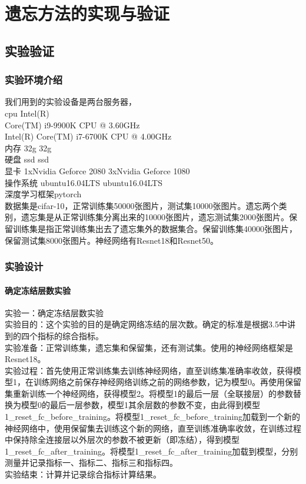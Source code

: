 
\chapter{遗忘方法的实现与验证}

\section{实验验证}

\subsection{实验环境介绍}
我们用到的实验设备是两台服务器，
\\cpu Intel(R) 
\\Core(TM) i9-9900K CPU @ 3.60GHz
\\Intel(R) Core(TM) i7-6700K CPU @ 4.00GHz
\\内存 32g 32g
\\硬盘 ssd ssd
\\显卡  1xNvidia Geforce 2080 3xNvidia Geforce 1080
\\操作系统 ubuntu16.04LTS ubuntu16.04LTS
\\深度学习框架pytorch
\\数据集是cifar-10，正常训练集50000张图片，测试集10000张图片。遗忘两个类别，遗忘集是从正常训练集分离出来的10000张图片，遗忘测试集2000张图片。保留训练集是指正常训练集出去了遗忘集外的数据集合。保留训练集40000张图片，保留测试集8000张图片。神经网络有Resnet18和Resnet50。
\subsection{实验设计}

\subsubsection{确定冻结层数实验}
实验一：确定冻结层数实验
\\实验目的：这个实验的目的是确定网络冻结的层次数。确定的标准是根据3.5中讲到的四个指标的综合指标。
\\实验准备：正常训练集，遗忘集和保留集，还有测试集。使用的神经网络框架是Resnet18。
\\实验过程：首先使用正常训练集去训练神经网络，直至训练集准确率收敛，获得模型1，在训练网络之前保存神经网络训练之前的网络参数，记为模型0。再使用保留集重新训练一个神经网络，获得模型2。将模型1的最后一层（全联接层）的参数替换为模型0的最后一层参数，模型1其余层数的参数不变，由此得到模型1\_reset\_fc\_before\_training。将模型1\_reset\_fc\_before\_training加载到一个新的神经网络中，使用保留集去训练这个新的网络，直至训练准确率收敛，在训练过程中保持除全连接层以外层次的参数不被更新（即冻结），得到模型1\_reset\_fc\_after\_training。将模型1\_reset\_fc\_after\_training加载到模型，分别测量并记录指标一、指标二、指标三和指标四。
\\实验结束：计算并记录综合指标计算结果。
